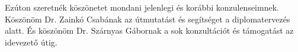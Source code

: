 \chapter*{\koszonetnyilvanitas}

Ezúton szeretnék köszönetet mondani jelenlegi és korábbi konzulenseimnek. Köszönöm Dr. Zainkó Csabának az útmutatást és segítséget a diplomatervezés alatt. És köszönöm Dr. Szárnyas Gábornak a sok konzultációt és támogatást az idevezető útig.